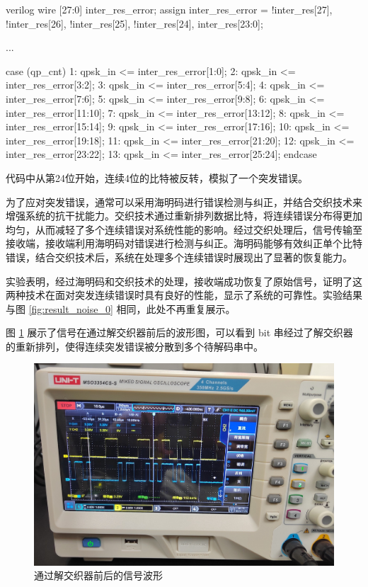 \begin{codeblock}{verilog}
wire [27:0] inter_res_error;
assign inter_res_error =  {!inter_res[27], !inter_res[26], !inter_res[25], !inter_res[24], inter_res[23:0]};

...

case (qp_cnt)
    1: qpsk_in <= inter_res_error[1:0];
    2: qpsk_in <= inter_res_error[3:2];
    3: qpsk_in <= inter_res_error[5:4];
    4: qpsk_in <= inter_res_error[7:6];
    5: qpsk_in <= inter_res_error[9:8];
    6: qpsk_in <= inter_res_error[11:10];
    7: qpsk_in <= inter_res_error[13:12];
    8: qpsk_in <= inter_res_error[15:14];
    9: qpsk_in <= inter_res_error[17:16];
    10: qpsk_in <= inter_res_error[19:18];
    11: qpsk_in <= inter_res_error[21:20];
    12: qpsk_in <= inter_res_error[23:22];
    13: qpsk_in <= inter_res_error[25:24];
endcase
\end{codeblock}

代码中从第24位开始，连续4位的比特被反转，模拟了一个突发错误。

为了应对突发错误，通常可以采用海明码进行错误检测与纠正，并结合交织技术来增强系统的抗干扰能力。交织技术通过重新排列数据比特，将连续错误分布得更加均匀，从而减轻了多个连续错误对系统性能的影响。经过交织处理后，信号传输至接收端，接收端利用海明码对错误进行检测与纠正。海明码能够有效纠正单个比特错误，结合交织技术后，系统在处理多个连续错误时展现出了显著的恢复能力。

实验表明，经过海明码和交织技术的处理，接收端成功恢复了原始信号，证明了这两种技术在面对突发连续错误时具有良好的性能，显示了系统的可靠性。实验结果与图 \ref{fig:result_noise_0} 相同，此处不再重复展示。

图 \ref{fig:wave} 展示了信号在通过解交织器前后的波形图，可以看到 bit 串经过了解交织器的重新排列，使得连续突发错误被分散到多个待解码串中。

\begin{figure}[ht]
    \centering
    \includegraphics[width=.8\textwidth]{static/wave.jpg} 
    \caption{通过解交织器前后的信号波形}\label{fig:wave}
\end{figure}


